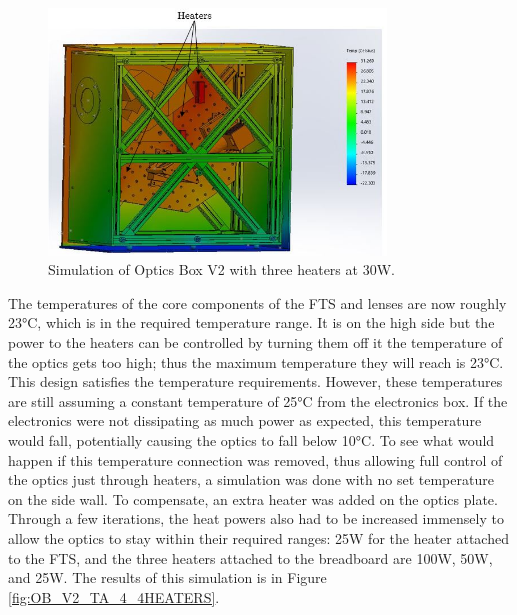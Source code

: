 \begin{figure}
    \centering
    \includegraphics[width=0.8\textwidth]{chap3_images/LIFE_V2_images/TA_25_-20_no_front_wall_three_heaters_labelled.JPG}
    \caption{Simulation of Optics Box V2 with three heaters at 30W.}
    \label{fig:OB_V2_TA_3_3HEATERS}
\end{figure}

The temperatures of the core components of the FTS and lenses are now roughly 23°C, which is in the required temperature range. It is on the high side but the power to the heaters can be controlled by turning them off it the temperature of the optics gets too high; thus the maximum temperature they will reach is 23°C. This design satisfies the temperature requirements. However, these temperatures are still assuming a constant temperature of 25°C from the electronics box. If the electronics were not dissipating as much power as expected, this temperature would fall, potentially causing the optics to fall below 10°C. To see what would happen if this temperature connection was removed, thus allowing full control of the optics just through heaters, a simulation was done with no set temperature on the side wall. To compensate, an extra heater was added on the optics plate. Through a few iterations, the heat powers also had to be increased immensely to allow the optics to stay within their required ranges: 25W for the heater attached to the FTS, and the three heaters attached to the breadboard are 100W, 50W, and 25W. The results of this simulation is in Figure \ref{fig:OB_V2_TA_4_4HEATERS}.

